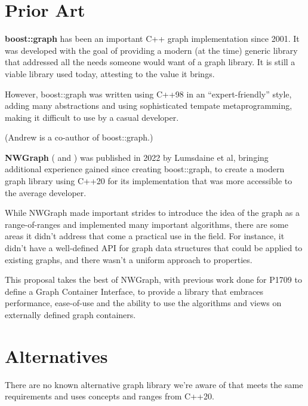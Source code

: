 \section{Prior Art}
\textbf{boost::graph} has been an important C++ graph implementation since 2001. It was developed with the goal of providing
a modern (at the time) generic library that addressed all the needs someone would want of a graph library. It is still a viable library used today, attesting to the value it brings.

However, boost::graph was written using C++98 in an ``expert-friendly'' style, adding many abstractions and using sophisticated tempate metaprogramming, making it difficult to use by a casual developer.

(Andrew is a co-author of boost::graph.)

\medskip

\textbf{NWGraph} (\cite{REF_nwgraph_library} and \cite{REF_nwgraph_paper}) was published in 2022
by Lumsdaine et al, bringing additional experience gained since creating boost::graph, to create a modern graph library using C++20 for its implementation 
that was more accessible to the average developer. %

While NWGraph made important strides to introduce the idea of the graph as a range-of-ranges and implemented many important algorithms,
there are some areas it didn't address that come a practical use in the field. For instance, it didn't have a well-defined API for graph
data structures that could be applied to existing graphs, and there wasn't a uniform approach to properties.

This proposal takes the best of NWGraph, with previous work done for P1709 to define a Graph Container Interface, to provide a library that
embraces performance, ease-of-use and the ability to use the algorithms and views on externally defined graph containers.

\section{Alternatives}
There are no known alternative graph library we're aware of that meets the same requirements and uses concepts and ranges from C++20.


